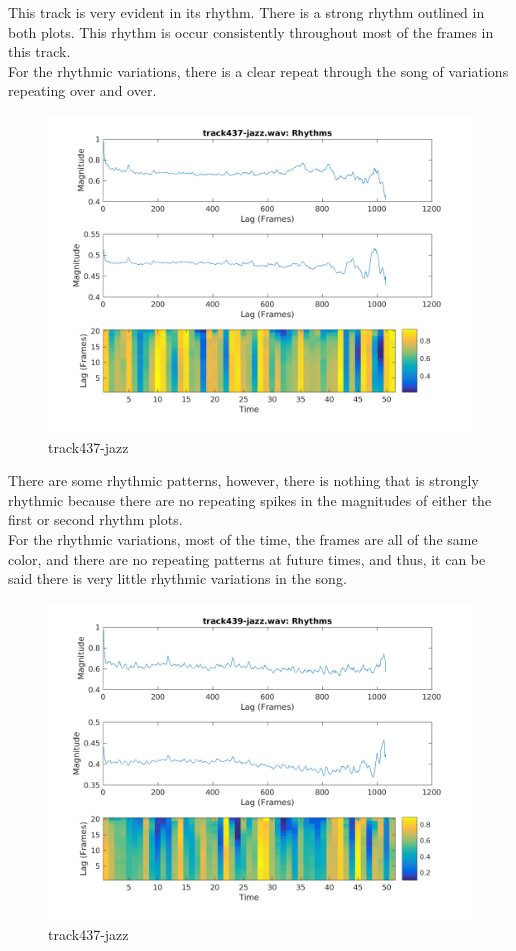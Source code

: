 \documentclass[11pt, a4paper]{article}
\begin{document}
This track is very evident in its rhythm. There is a strong rhythm outlined in both plots. This rhythm is occur consistently throughout most of the frames in this track. \\

For the rhythmic variations, there is a clear repeat through the song of variations repeating over and over. \\

\begin{figure}[H]
    \centering
    \includegraphics[width=.8\textwidth]{track437-jazz-Rhythm.png}
    \caption{track437-jazz}
\end{figure}

There are some rhythmic patterns, however, there is nothing that is strongly rhythmic because there are no repeating spikes in the magnitudes of either the first or second rhythm plots. \\

For the rhythmic variations, most of the time, the frames are all of the same color, and there are no repeating patterns at future times, and thus, it can be said there is very little rhythmic variations in the song. 

\begin{figure}[H]
    \centering
    \includegraphics[width=.8\textwidth]{track439-jazz-Rhythm.png}
    \caption{track437-jazz}
\end{figure}
\end{document}
